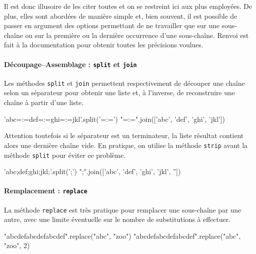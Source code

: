 Il est donc illusoire de les citer toutes et on se restreint ici aux plus employées. De plus, elles sont abordées de manière simple et, bien souvent, il est possible de passer en argument des options permettant de ne travailler que sur une sous-chaîne ou sur la première ou la dernière occurrence d'une sous-chaîne. Renvoi est fait à la documentation pour obtenir toutes les précisions voulues.

\paragraph{Découpage--Assemblage : {\normalfont\texttt{split}} et {\normalfont\texttt{join}}}
Les méthodes \texttt{split} et \texttt{join} permettent respectivement de découper une chaîne selon un séparateur pour obtenir une liste et, à l'inverse, de reconstruire une chaîne à partir d'une liste.

\begin{idleconsole}
	\begin{pyconsole}
		'abc=:=def=:=ghi=:=jkl'.split('=:=')
		"=:=".join(['abc', 'def', 'ghi', 'jkl'])
	\end{pyconsole}
\end{idleconsole}

Attention toutefois si le séparateur est un terminateur, la liste résultat contient alors une dernière chaîne vide. En pratique, on utilise la méthode \texttt{strip} avant la méthode \texttt{split} pour éviter ce problème.

\begin{idleconsole}
	\begin{pyconsole}
		'abc;def;ghi;jkl;'.split(';')
		";".join(['abc', 'def', 'ghi', 'jkl', ''])
	\end{pyconsole}
\end{idleconsole}

\vspace{1pt}

\paragraph{Remplacement : {\normalfont\texttt{replace}}}
La méthode \texttt{replace} est très pratique pour remplacer une sous-chaîne par une autre, avec une limite éventuelle sur le nombre de substitutions à effectuer.

\begin{idleconsole}
	\begin{pyconsole}
		"abcdefabcdefabcdef".replace("abc", "zoo")
		"abcdefabcdefabcdef".replace("abc", "zoo", 2)
	\end{pyconsole}
\end{idleconsole}


